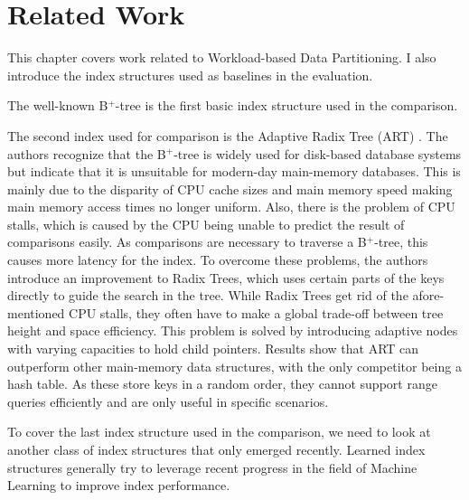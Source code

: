 \thispagestyle{plain}
\chapter{Related Work}

This chapter covers work related to Workload-based Data Partitioning. I also introduce the index structures used as baselines in the evaluation.

The well-known B$^+$-tree \cite{Bayer1970-rh} is the first basic index structure used in the comparison.

The second index used for comparison is the Adaptive Radix Tree (ART) \cite{Leis2013}. The authors recognize that the B$^+$-tree is widely used for disk-based database systems but indicate that it is unsuitable for modern-day main-memory databases. This is mainly due to the disparity of CPU cache sizes and main memory speed making main memory access times no longer uniform. Also, there is the problem of CPU stalls, which is caused by the CPU being unable to predict the result of comparisons easily. As comparisons are necessary to  traverse a B$^+$-tree, this causes more latency for the index. To overcome these problems, the authors introduce an improvement to Radix Trees, which uses certain parts of the keys directly to guide the search in the tree. While Radix Trees get rid of the afore-mentioned CPU stalls, they often have to make a global trade-off between tree height and space efficiency. This problem is solved by introducing adaptive nodes with varying capacities to hold child pointers. Results show that ART can outperform other main-memory data structures, with the only competitor being a hash table. As these store keys in a random order, they cannot support range queries efficiently and are only useful in specific scenarios.

To cover the last index structure used in the comparison, we need to look at another class of index structures that only emerged recently. Learned index structures generally try to leverage recent progress in the field of Machine Learning to improve index performance.

